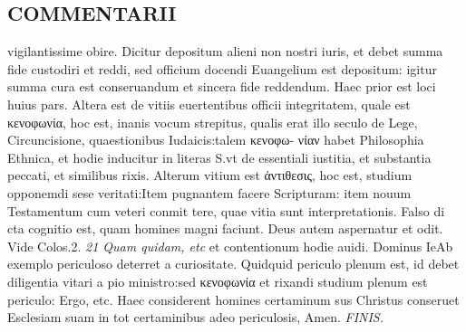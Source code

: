 \documentclass{article}
\begin{document}
\begin{pages}
\section*{COMMENTARII }
\marginpar{[ p.170 ]}\pstart vigilantissime obire. Dicitur depositum alieni non nostri iuris, et debet summa fide custodiri et reddi, sed officium docendi Euangelium est depositum: igitur summa cura est conseruandum et sincera fide reddendum. Haec prior est loci huius pars. Altera est de vitiis euertentibus officii integritatem, quale est κενοφωνία, hoc est, inanis vocum strepitus, qualis erat illo seculo de Lege, Circuncisione, quaestionibus Iudaicis:talem κενοφω- νίαν habet Philosophia Ethnica, et hodie inducitur in literas S.vt de essentiali iustitia, et substantia peccati, et similibus rixis. Alterum vitium est ἀντιθεσις, hoc est, studium opponemdi sese veritati:Item pugnantem facere Scripturam: item nouum Testamentum cum veteri conmit tere, quae vitia sunt interpretationis. Falso di cta cognitio est, quam homines magni faciunt. Deus autem aspernatur et odit. Vide Colos.2.  \pend
\textit{21 Quam quidam, etc }\pstart et contentionum hodie auidi. Dominus IeAb exemplo periculoso deterret a curiositate. Quidquid periculo plenum est, id debet diligentia vitari a pio ministro:sed κενοφωνία et rixandi studium plenum est periculo: Ergo, etc. Haec considerent homines certaminum sus Christus conseruet Esclesiam suam in tot certaminibus adeo periculosis, Amen.  \pend
\textit{FINIS. }
\end{pages}
\end{document}

